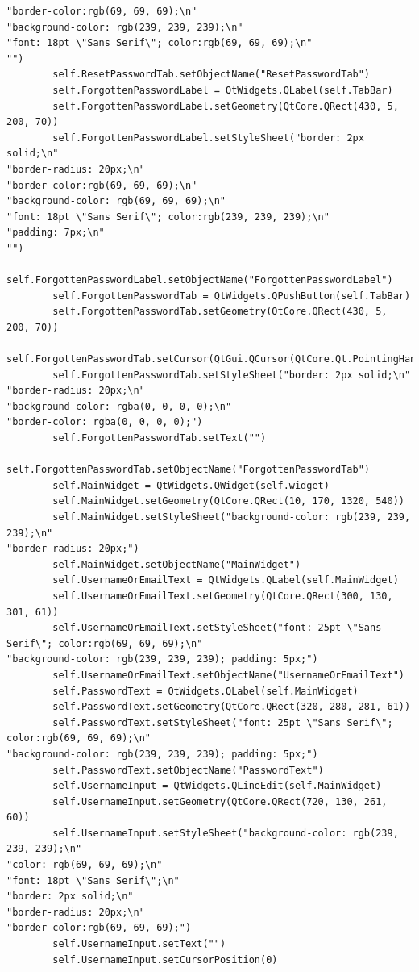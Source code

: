 \documentclass[12pt]{article}
\begin{document}
\begin{lstlisting}
"border-color:rgb(69, 69, 69);\n"
"background-color: rgb(239, 239, 239);\n"
"font: 18pt \"Sans Serif\"; color:rgb(69, 69, 69);\n"
"")
        self.ResetPasswordTab.setObjectName("ResetPasswordTab")
        self.ForgottenPasswordLabel = QtWidgets.QLabel(self.TabBar)
        self.ForgottenPasswordLabel.setGeometry(QtCore.QRect(430, 5, 200, 70))
        self.ForgottenPasswordLabel.setStyleSheet("border: 2px solid;\n"
"border-radius: 20px;\n"
"border-color:rgb(69, 69, 69);\n"
"background-color: rgb(69, 69, 69);\n"
"font: 18pt \"Sans Serif\"; color:rgb(239, 239, 239);\n"
"padding: 7px;\n"
"")
        self.ForgottenPasswordLabel.setObjectName("ForgottenPasswordLabel")
        self.ForgottenPasswordTab = QtWidgets.QPushButton(self.TabBar)
        self.ForgottenPasswordTab.setGeometry(QtCore.QRect(430, 5, 200, 70))
        self.ForgottenPasswordTab.setCursor(QtGui.QCursor(QtCore.Qt.PointingHandCursor))
        self.ForgottenPasswordTab.setStyleSheet("border: 2px solid;\n"
"border-radius: 20px;\n"
"background-color: rgba(0, 0, 0, 0);\n"
"border-color: rgba(0, 0, 0, 0);")
        self.ForgottenPasswordTab.setText("")
        self.ForgottenPasswordTab.setObjectName("ForgottenPasswordTab")
        self.MainWidget = QtWidgets.QWidget(self.widget)
        self.MainWidget.setGeometry(QtCore.QRect(10, 170, 1320, 540))
        self.MainWidget.setStyleSheet("background-color: rgb(239, 239, 239);\n"
"border-radius: 20px;")
        self.MainWidget.setObjectName("MainWidget")
        self.UsernameOrEmailText = QtWidgets.QLabel(self.MainWidget)
        self.UsernameOrEmailText.setGeometry(QtCore.QRect(300, 130, 301, 61))
        self.UsernameOrEmailText.setStyleSheet("font: 25pt \"Sans Serif\"; color:rgb(69, 69, 69);\n"
"background-color: rgb(239, 239, 239); padding: 5px;")
        self.UsernameOrEmailText.setObjectName("UsernameOrEmailText")
        self.PasswordText = QtWidgets.QLabel(self.MainWidget)
        self.PasswordText.setGeometry(QtCore.QRect(320, 280, 281, 61))
        self.PasswordText.setStyleSheet("font: 25pt \"Sans Serif\"; color:rgb(69, 69, 69);\n"
"background-color: rgb(239, 239, 239); padding: 5px;")
        self.PasswordText.setObjectName("PasswordText")
        self.UsernameInput = QtWidgets.QLineEdit(self.MainWidget)
        self.UsernameInput.setGeometry(QtCore.QRect(720, 130, 261, 60))
        self.UsernameInput.setStyleSheet("background-color: rgb(239, 239, 239);\n"
"color: rgb(69, 69, 69);\n"
"font: 18pt \"Sans Serif\";\n"
"border: 2px solid;\n"
"border-radius: 20px;\n"
"border-color:rgb(69, 69, 69);")
        self.UsernameInput.setText("")
        self.UsernameInput.setCursorPosition(0)

\end{lstlisting}
\end{document}
